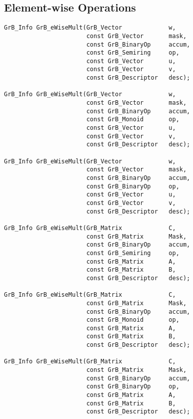 \documentclass[11pt]{article}
\begin{document}
\subsection{Element-wise Operations}

\begin{verbatim}
GrB_Info GrB_eWiseMult(GrB_Vector             w,
                       const GrB_Vector       mask,
                       const GrB_BinaryOp     accum,
                       const GrB_Semiring     op,
                       const GrB_Vector       u,
                       const GrB_Vector       v,
                       const GrB_Descriptor   desc);
                            
GrB_Info GrB_eWiseMult(GrB_Vector             w,
                       const GrB_Vector       mask,
                       const GrB_BinaryOp     accum,
                       const GrB_Monoid       op,
                       const GrB_Vector       u,
                       const GrB_Vector       v,
                       const GrB_Descriptor   desc);

GrB_Info GrB_eWiseMult(GrB_Vector             w,
                       const GrB_Vector       mask,
                       const GrB_BinaryOp     accum,
                       const GrB_BinaryOp     op,
                       const GrB_Vector       u,
                       const GrB_Vector       v,
                       const GrB_Descriptor   desc);

GrB_Info GrB_eWiseMult(GrB_Matrix             C,
                       const GrB_Matrix       Mask,
                       const GrB_BinaryOp     accum,
                       const GrB_Semiring     op,
                       const GrB_Matrix       A,
                       const GrB_Matrix       B,
                       const GrB_Descriptor   desc);

GrB_Info GrB_eWiseMult(GrB_Matrix             C,
                       const GrB_Matrix       Mask,
                       const GrB_BinaryOp     accum,
                       const GrB_Monoid       op, 
                       const GrB_Matrix       A,
                       const GrB_Matrix       B,
                       const GrB_Descriptor   desc);

GrB_Info GrB_eWiseMult(GrB_Matrix             C,
                       const GrB_Matrix       Mask,
                       const GrB_BinaryOp     accum,
                       const GrB_BinaryOp     op, 
                       const GrB_Matrix       A,
                       const GrB_Matrix       B,
                       const GrB_Descriptor   desc);


\end{verbatim}
\end{document}
